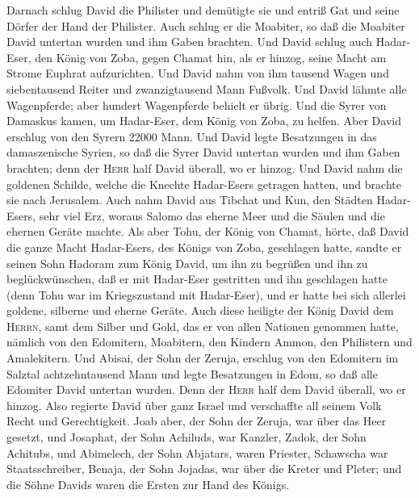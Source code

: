  Darnach schlug David die Philister und demütigte sie und
entriß Gat und seine Dörfer der Hand der Philister.  Auch
schlug er die Moabiter, so daß die Moabiter David untertan wurden und
ihm Gaben brachten.  Und David schlug auch Hadar-Eser, den
König von Zoba, gegen Chamat hin, als er hinzog, seine Macht am Strome
Euphrat aufzurichten.  Und David nahm von ihm tausend
Wagen und siebentausend Reiter und zwanzigtausend Mann Fußvolk. Und
David lähmte alle Wagenpferde; aber hundert Wagenpferde behielt er
übrig.  Und die Syrer von Damaskus kamen, um Hadar-Eser,
dem König von Zoba, zu helfen. Aber David erschlug von den Syrern 22000
Mann.  Und David legte Besatzungen in das damaszenische
Syrien, so daß die Syrer David untertan wurden und ihm Gaben brachten;
denn der \textsc{Herr} half David überall, wo er hinzog. 
Und David nahm die goldenen Schilde, welche die Knechte Hadar-Esers
getragen hatten, und brachte sie nach Jerusalem.  Auch
nahm David aus Tibchat und Kun, den Städten Hadar-Esers, sehr viel Erz,
woraus Salomo das eherne Meer und die Säulen und die ehernen Geräte
machte.  Als aber Tohu, der König von Chamat, hörte, daß
David die ganze Macht Hadar-Esers, des Königs von Zoba, geschlagen
hatte,  sandte er seinen Sohn Hadoram zum König David, um
ihn zu begrüßen und ihn zu beglückwünschen, daß er mit Hadar-Eser
gestritten und ihn geschlagen hatte (denn Tohu war im Kriegszustand mit
Hadar-Eser), und er hatte bei sich allerlei goldene, silberne und eherne
Geräte.  Auch diese heiligte der König David dem
\textsc{Herrn}, samt dem Silber und Gold, das er von allen Nationen
genommen hatte, nämlich von den Edomitern, Moabitern, den Kindern Ammon,
den Philistern und Amalekitern.  Und Abisai, der Sohn der
Zeruja, erschlug von den Edomitern im Salztal achtzehntausend Mann
 und legte Besatzungen in Edom, so daß alle Edomiter
David untertan wurden. Denn der \textsc{Herr} half dem David überall, wo
er hinzog.  Also regierte David über ganz Israel und
verschaffte all seinem Volk Recht und Gerechtigkeit. 
Joab aber, der Sohn der Zeruja, war über das Heer gesetzt, und Josaphat,
der Sohn Achiluds, war Kanzler,  Zadok, der Sohn
Achitubs, und Abimelech, der Sohn Abjatars, waren Priester, Schawscha
war Staatsschreiber,  Benaja, der Sohn Jojadas, war über
die Kreter und Pleter; und die Söhne Davids waren die Ersten zur Hand
des Königs.


